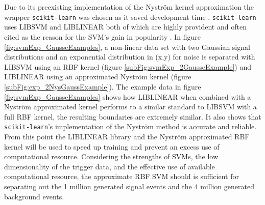 \\\\Due to its preexisting implementation of the Nyström kernel approximation the wrapper \texttt{scikit-learn} was chosen as it saved development time \cite{scikit-learn}. \texttt{scikit-learn} uses LIBSVM \cite{chang2011libsvm} and LIBLINEAR \cite{fan2008liblinear} both of which are highly provident and often cited as the reason for the SVM's gain in popularity \cite{murty2016support}. In figure \ref{fig:svmExp_GausseExamples}, a non-linear data set with two Gaussian signal distributions and an exponential distribution in (x,y) for noise is separated with LIBSVM using an RBF kernel (figure \ref{subFig:svmExp_2GausseExample}) and LIBLINEAR using an approximated Nyström kernel (figure \ref{subFig:exp_2NysGaussExample}). The example data in figure \ref{fig:svmExp_GausseExamples} shows how LIBLINEAR when combined with a Nyström approximated kernel performs to a similar standard to LIBSVM with a full RBF kernel, the resulting boundaries are extremely similar. It also shows that \texttt{scikit-learn}'s implementation of the Nyström method is accurate and reliable. From this point the LIBLINEAR library and the Nyström approximated RBF kernel will be used to speed up training and prevent an excess use of computational resource. Considering the strengths of SVMs, the low dimensionality of the trigger data, and the effective use of available computational resource, the approximate RBF SVM should is sufficient for separating out the 1 million generated signal events and the 4 million generated background events. 

